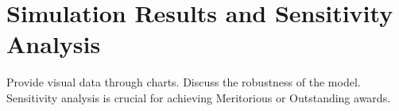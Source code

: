 \section{Simulation Results and Sensitivity Analysis}Provide visual data through charts. Discuss the robustness of the model.
Sensitivity analysis is crucial for achieving Meritorious or Outstanding awards.
